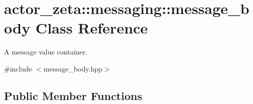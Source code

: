 \hypertarget{classactor__zeta_1_1messaging_1_1message__body}{}\section{actor\+\_\+zeta\+:\+:messaging\+:\+:message\+\_\+body Class Reference}
\label{classactor__zeta_1_1messaging_1_1message__body}


A message value container.  




{\ttfamily \#include $<$message\+\_\+body.\+hpp$>$}

\subsection*{Public Member Functions}
